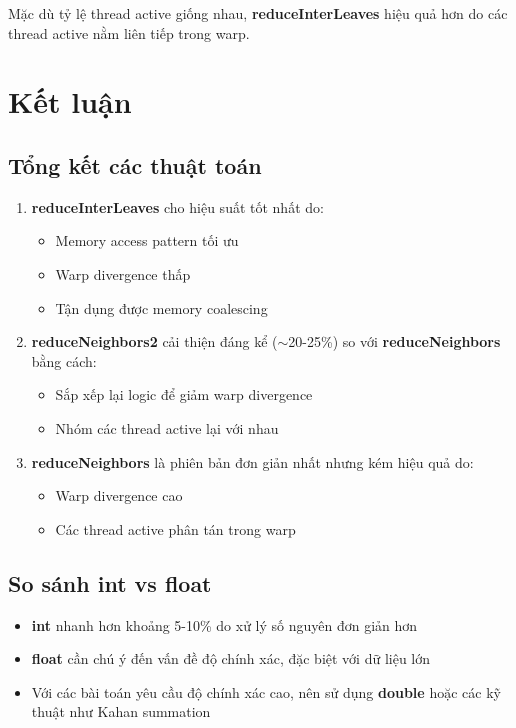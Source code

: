 \documentclass[12pt,a4paper]{article}
\begin{document}
Mặc dù tỷ lệ thread active giống nhau, \textbf{reduceInterLeaves} hiệu quả hơn do các thread active nằm liên tiếp trong warp.

\section{Kết luận}

\subsection{Tổng kết các thuật toán}

\begin{enumerate}
    \item \textbf{reduceInterLeaves} cho hiệu suất tốt nhất do:
    \begin{itemize}
        \item Memory access pattern tối ưu
        \item Warp divergence thấp
        \item Tận dụng được memory coalescing
    \end{itemize}
    
    \item \textbf{reduceNeighbors2} cải thiện đáng kể ($\sim$20-25\%) so với \textbf{reduceNeighbors} bằng cách:
    \begin{itemize}
        \item Sắp xếp lại logic để giảm warp divergence
        \item Nhóm các thread active lại với nhau
    \end{itemize}
    
    \item \textbf{reduceNeighbors} là phiên bản đơn giản nhất nhưng kém hiệu quả do:
    \begin{itemize}
        \item Warp divergence cao
        \item Các thread active phân tán trong warp
    \end{itemize}
\end{enumerate}

\subsection{So sánh int vs float}

\begin{itemize}
    \item \textbf{int} nhanh hơn khoảng 5-10\% do xử lý số nguyên đơn giản hơn
    \item \textbf{float} cần chú ý đến vấn đề độ chính xác, đặc biệt với dữ liệu lớn
    \item Với các bài toán yêu cầu độ chính xác cao, nên sử dụng \textbf{double} hoặc các kỹ thuật như Kahan summation
\end{itemize}
\end{document}
